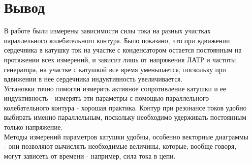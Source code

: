 \documentclass[a4paper, 12pt]{article}
\begin{document}
\section*{Вывод}
В работе были измерены зависимости силы тока на разных участках параллельного колебательного контура. Было показано, что при вдвижении сердечника в катушку
ток на участке с конденсатором остается постоянным на протяжении всех измерений, и зависит лишь от напряжения ЛАТР и частоты генератора, на участке с катушкой все время уменьшается, поскольку при вдвижении в нее
сердечника индуктивность увеличивается.\\
Установки точно помогли измерить активное сопротивление катушки и ее индуктивность - измерять эти параметры с помощью параллельного колебательного контура - хорошая практика.
Контур при резонансе токов удобно выбирать именно параллельным, поскольку необходимо удерживать постоянным только напряжение.\\
Методы измерений параметров катушки удобны, особенно векторные диаграммы - они позволяют вычислять необходимые величины, которые, вообще говоря, могут зависеть от времени - например, сила тока в цепи.
\end{document}
